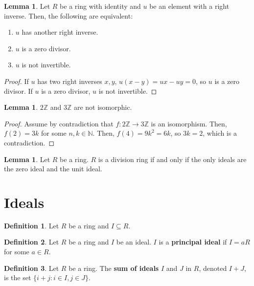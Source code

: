 \documentclass{article}
\theoremstyle{definition}
\newtheorem{definition}{Definition}
\newtheorem{lemma}[theorem]{Lemma}
\newcommand{\N}{\mathbb{N}}
\newcommand{\Z}{\mathbb{Z}}
\begin{document}
\begin{lemma}
    Let $R$ be a ring with identity and $u$ be an element with a right inverse.
    Then, the following are equivalent:

    \begin{enumerate}
        \item $u$ has another right inverse.
        \item $u$ is a zero divisor.
        \item $u$ is not invertible.
    \end{enumerate}
\end{lemma}
\begin{proof}
    If $u$ has two right inverses $x,y$, $u(x-y) = ux - uy = 0$, so $u$ is a zero divisor.
    If $u$ is a zero divisor, $u$ is not invertible. 
\end{proof}

\begin{lemma}
    $2\Z$ and $3\Z$ are not isomorphic.
\end{lemma}
\begin{proof}
    Assume by contradiction that $f: 2\Z \xrightarrow{} 3\Z$ is an isomorphism.
    Then, $f(2) = 3k$ for some $n,k \in \N$. Then, $f(4) = 9k^{2} = 6k$, so 
    $3k = 2$, which is a contradiction.
\end{proof}

\begin{lemma}
    Let $R$ be a ring. $R$ is a division ring if and only if the only ideals are the zero
    ideal and the unit ideal.
\end{lemma}

\newpage

\section{Ideals}

\begin{definition}
    Let $R$ be a ring and $I \subseteq R$.
\end{definition}

\begin{definition}
    Let $R$ be a ring and $I$ be an ideal. $I$ is a \textbf{principal ideal} if $I = aR$ 
    for some $a \in R$.
\end{definition}

\begin{definition}
    Let $R$ be a ring. The \textbf{sum of ideals} $I$ and $J$ in $R$, 
    denoted $I + J$, is the set $\{ i + j: i \in I, j \in J\}$.
\end{definition}
\end{document}
